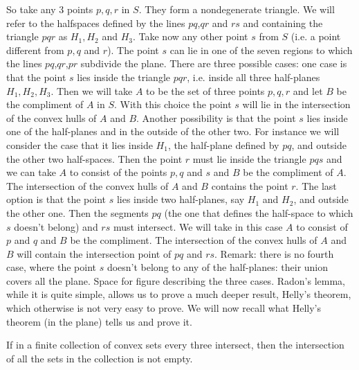 So take any $3$ points $p,q,r$ in $S$. They form a nondegenerate triangle. We will refer to the halfspaces defined by the lines $pq$,$qr$ and $rs$ and containing the triangle $pqr$ as $H_1,H_2$ and $H_3$. Take now any other point $s$ from $S$ (i.e. a point different from $p,q$ and $r$). The point $s$ can lie in one of the seven regions to which the lines $pq$,$qr$,$pr$ subdivide the plane. There are three possible cases: one case is that the point $s$ lies inside the triangle $pqr$, i.e. inside all three half-planes $H_1,H_2,H_3$. Then we will take $A$ to be the set of three points $p,q,r$ and let $B$ be the compliment of $A$ in $S$. With this choice the point $s$ will lie in the intersection of the convex hulls of $A$ and $B$. Another possibility is that the point $s$ lies inside one of the half-planes and in the outside of the other two. For instance we will consider the case that it lies inside $H_1$, the half-plane defined by $pq$, and outside the other two half-spaces. Then the point $r$ must lie inside the triangle $pqs$ and we can take $A$ to consist of the points $p,q$ and $s$ and $B$ be the compliment of $A$. The intersection of the convex hulls of $A$ and $B$ contains the point $r$. The last option is that the point $s$ lies inside two half-planes, say $H_1$ and $H_2$, and outside the other one. Then the segments $pq$ (the one that defines the half-space to which $s$ doesn't belong) and $rs$ must intersect. We will take in this case $A$ to consist of $p$ and $q$ and $B$ be the compliment. The intersection of the convex hulls of $A$ and $B$ will contain the intersection point of $pq$ and $rs$.
Remark: there is no fourth case, where the point $s$ doesn't belong to any of the half-planes: their union covers all the plane.
Space for figure describing the three cases.
Radon's lemma, while it is quite simple, allows us to prove a much deeper result, Helly's theorem, which otherwise is not very easy to prove.
We will now recall what Helly's theorem (in the plane) tells us and prove it.
\begin{theorem}
If in a finite collection of convex sets every three intersect, then the intersection of all the sets in the collection is not empty.
\end{theorem}
